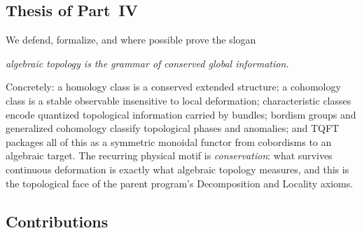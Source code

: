 \documentclass[12pt]{article}
\theoremstyle{definition}
\theoremstyle{remark}
\begin{document}
\subsection{Thesis of Part~IV}

We defend, formalize, and where possible prove the slogan
\begin{center}
\emph{algebraic topology is the grammar of conserved global information.}
\end{center}
Concretely: a homology class is a conserved extended structure; a cohomology
class is a stable observable insensitive to local deformation; characteristic
classes encode quantized topological information carried by bundles; bordism
groups and generalized cohomology classify topological phases and anomalies; and
TQFT packages all of this as a symmetric monoidal functor from cobordisms to an
algebraic target. The recurring physical motif is \emph{conservation}: what
survives continuous deformation is exactly what algebraic topology measures, and
this is the topological face of the parent program's Decomposition and Locality
axioms.

\subsection{Contributions}
\end{document}
